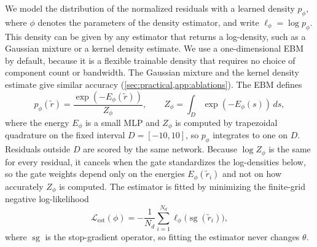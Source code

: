 \documentclass[twoside]{article}
\newcommand{\sg}{\operatorname{sg}}
\begin{document}
We model the distribution of the normalized residuals with a learned density
$p_\phi$, where $\phi$ denotes the parameters of the density estimator, and
write $\ell_\phi = \log p_\phi$. This density can be given by any estimator that
returns a log-density, such as a Gaussian mixture or a kernel density
estimate. We use a one-dimensional EBM by default, because it is a flexible
trainable density that requires no choice of component count or bandwidth.
The Gaussian mixture and the kernel density estimate give similar accuracy
(\cref{sec:practical,app:ablations}). The EBM defines
\begin{equation}
p_\phi(\tilde r) = \frac{\exp(-E_\phi(\tilde r))}{Z_\phi}, \qquad
Z_\phi = \int_{D} \exp(-E_\phi(s))\,ds,
\label{eq:ebm}
\end{equation}
where the energy $E_\phi$ is a small MLP and $Z_\phi$ is computed by trapezoidal
quadrature on the fixed interval $D = [-10, 10]$, so $p_\phi$ integrates to one
on $D$. Residuals outside $D$ are scored by the same network. Because
$\log Z_\phi$ is the same for every residual, it cancels when the gate
standardizes the log-densities below, so the gate weights depend only on the
energies $E_\phi(\tilde r_i)$ and not on how accurately $Z_\phi$ is computed.
The estimator is fitted by minimizing the finite-grid negative log-likelihood
\begin{equation}
\mathcal{L}_{\mathrm{est}}(\phi) = -\frac{1}{N_d}\sum_{i=1}^{N_d}
\ell_\phi\big(\sg(\tilde r_i)\big),
\label{eq:est}
\end{equation}
where $\sg$ is the stop-gradient operator, so fitting the estimator never
changes $\theta$.
\end{document}
